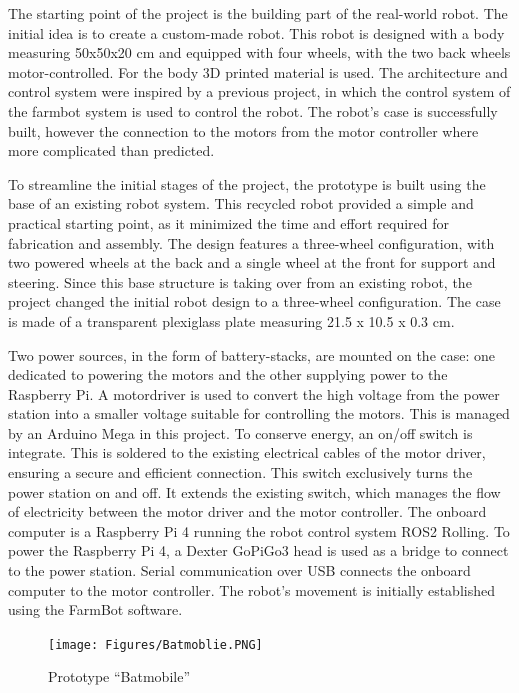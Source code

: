 The starting point of the project is the building part of the real-world robot. The initial idea is to create a custom-made robot. This robot is designed with a body measuring 50x50x20 cm and equipped with four wheels, with the two back wheels motor-controlled. For the body 3D printed material is used. 
The architecture and control system were inspired by a previous project, in which the control system of the farmbot system is used to control the robot. The robot's case is successfully built, however the connection to the motors from the motor controller where more complicated than predicted.  

To streamline the initial stages of the project, the prototype is built using the base of an existing robot system. This recycled robot provided a simple and practical starting point, as it minimized the time and effort required for fabrication and assembly. The design features a three-wheel configuration, with two powered wheels at the back and a single wheel at the front for support and steering. Since this base structure is taking over from an existing robot, the project changed the initial robot design to a three-wheel configuration. The case is made of a transparent plexiglass plate measuring 21.5 x 10.5 x 0.3 cm.  

Two power sources, in the form of battery-stacks, are mounted on the case: one dedicated to powering the motors and the other supplying power to the Raspberry Pi. A motor\-driver is used to convert the high voltage from the power station into a smaller voltage suitable for controlling the motors. This is managed by an Arduino Mega in this project. To conserve energy, an on/off switch is integrate. 
This is soldered to the existing electrical cables of the motor driver, ensuring a secure and efficient connection. This switch exclusively turns the power station on and off. It extends the existing switch, which manages the flow of electricity between the motor driver and the motor controller. The onboard computer is a Raspberry Pi 4 running the robot control system ROS2 Rolling. To power the Raspberry Pi 4, a Dexter GoPiGo3 head is used as a bridge to connect to the power station. Serial communication over USB connects the onboard computer to the motor controller. The robot's movement is initially established using the FarmBot software.

\begin{figure}[h]
    \centering
    \texttt{[image: Figures/Batmoblie.PNG]}
    \caption{Prototype ``Batmobile''}

\end{figure}

